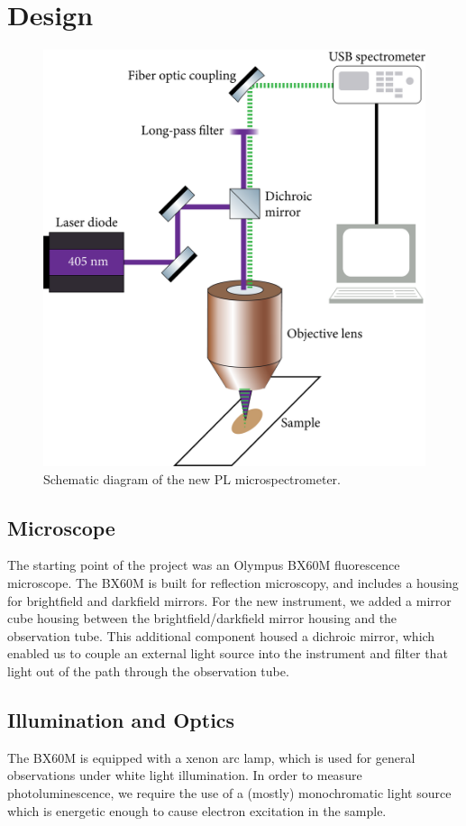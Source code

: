 \section{Design}

\begin{figure}[h]
    \centering
    \includegraphics[width=.75\textwidth]{img/optical-diagram.png}
    \caption{Schematic diagram of the new PL microspectrometer.}
    \label{img:optical-diagram}
\end{figure}

\subsection{Microscope}

The starting point of the project was an Olympus BX60M fluorescence microscope. The BX60M is built for reflection microscopy, and includes a housing for brightfield and darkfield mirrors. For the new instrument, we added a mirror cube housing between the brightfield/darkfield mirror housing and the observation tube. This additional component housed a dichroic mirror, which enabled us to couple an external light source into the instrument and filter that light out of the path through the observation tube.


\subsection{Illumination and Optics}
The BX60M is equipped with a xenon arc lamp, which is used for general observations under white light illumination. In order to measure photoluminescence, we require the use of a (mostly) monochromatic light source which is energetic enough to cause electron excitation in the sample. 


